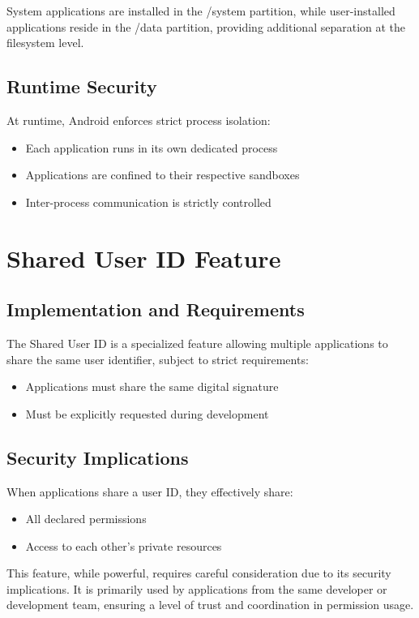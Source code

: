\documentclass{article}
\begin{document}
System applications are installed in the /system partition, while user-installed applications reside in the /data partition, providing additional separation at the filesystem level.

\subsection{Runtime Security}
At runtime, Android enforces strict process isolation:
\begin{itemize}
    \item Each application runs in its own dedicated process
    \item Applications are confined to their respective sandboxes
    \item Inter-process communication is strictly controlled
\end{itemize}

\section{Shared User ID Feature}
\subsection{Implementation and Requirements}
The Shared User ID is a specialized feature allowing multiple applications to share the same user identifier, subject to strict requirements:
\begin{itemize}
    \item Applications must share the same digital signature
    \item Must be explicitly requested during development
\end{itemize}

\subsection{Security Implications}
When applications share a user ID, they effectively share:
\begin{itemize}
    \item All declared permissions
    \item Access to each other's private resources
\end{itemize}

This feature, while powerful, requires careful consideration due to its security implications. It is primarily used by applications from the same developer or development team, ensuring a level of trust and coordination in permission usage.
\end{document}
